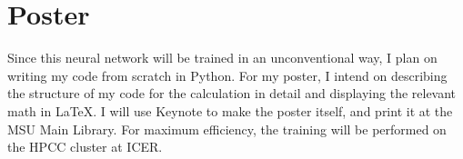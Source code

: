 \documentclass[prb,aps,twocolumn,showpacs,10pt]{revtex4-1}
\begin{document}
 \section{Poster}
 
Since this neural network will be trained in an unconventional way, I plan on writing my code from scratch in Python. For my poster, I intend on describing the structure of my code for the calculation in detail and displaying the relevant math in LaTeX. I will use Keynote to make the poster itself, and print it at the MSU Main Library. For maximum efficiency, the training will be performed on the HPCC cluster at ICER.
\end{document}
